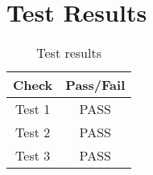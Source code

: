 \section{Test Results}

\begin{table}[H]
	\caption{Test results}
	\label{tab:results}
	\centering \fontsize{10}{10}\selectfont
	\begin{tabular}{c | c}
		\hline\hline
		\textbf{Check} 			&\textbf{Pass/Fail} \\ 
		\hline
	   Test 1	   			& PASS \\ 
	   Test 2	   			&PASS \\ 
	   Test 3	   			& PASS\\ 
	   \hline\hline
	\end{tabular}
\end{table}
